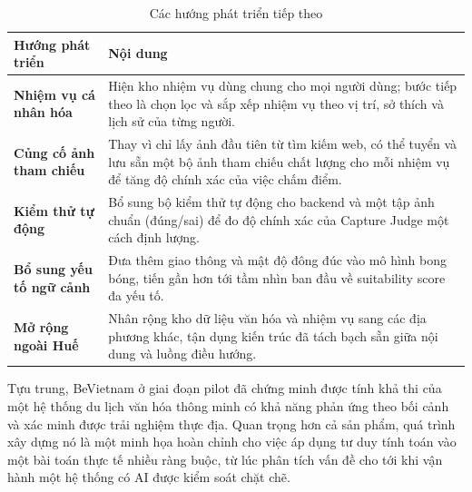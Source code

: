 \begin{table}[H]
\centering
\caption{Các hướng phát triển tiếp theo}
\label{tab:future_work}
\begin{tabularx}{\textwidth}{>{\raggedright\arraybackslash}p{3.6cm} X}
\toprule
\textbf{Hướng phát triển} & \textbf{Nội dung} \\
\midrule
\textbf{Nhiệm vụ cá nhân hóa} & Hiện kho nhiệm vụ dùng chung cho mọi người dùng; bước tiếp theo là chọn lọc và sắp xếp nhiệm vụ theo vị trí, sở thích và lịch sử của từng người. \\
\textbf{Củng cố ảnh tham chiếu} & Thay vì chỉ lấy ảnh đầu tiên từ tìm kiếm web, có thể tuyển và lưu sẵn một bộ ảnh tham chiếu chất lượng cho mỗi nhiệm vụ để tăng độ chính xác của việc chấm điểm. \\
\textbf{Kiểm thử tự động} & Bổ sung bộ kiểm thử tự động cho backend và một tập ảnh chuẩn (đúng/sai) để đo độ chính xác của Capture Judge một cách định lượng. \\
\textbf{Bổ sung yếu tố ngữ cảnh} & Đưa thêm giao thông và mật độ đông đúc vào mô hình bong bóng, tiến gần hơn tới tầm nhìn ban đầu về suitability score đa yếu tố. \\
\textbf{Mở rộng ngoài Huế} & Nhân rộng kho dữ liệu văn hóa và nhiệm vụ sang các địa phương khác, tận dụng kiến trúc đã tách bạch sẵn giữa nội dung và luồng điều hướng. \\
\bottomrule
\end{tabularx}
\end{table}

Tựu trung, BeVietnam ở giai đoạn pilot đã chứng minh được tính khả thi
của một hệ thống du lịch văn hóa thông minh có khả năng phản ứng theo bối
cảnh và xác minh được trải nghiệm thực địa. Quan trọng hơn cả sản phẩm,
quá trình xây dựng nó là một minh họa hoàn chỉnh cho việc áp dụng tư duy
tính toán vào một bài toán thực tế nhiều ràng buộc, từ lúc phân tích vấn
đề cho tới khi vận hành một hệ thống có AI được kiểm soát chặt chẽ.
